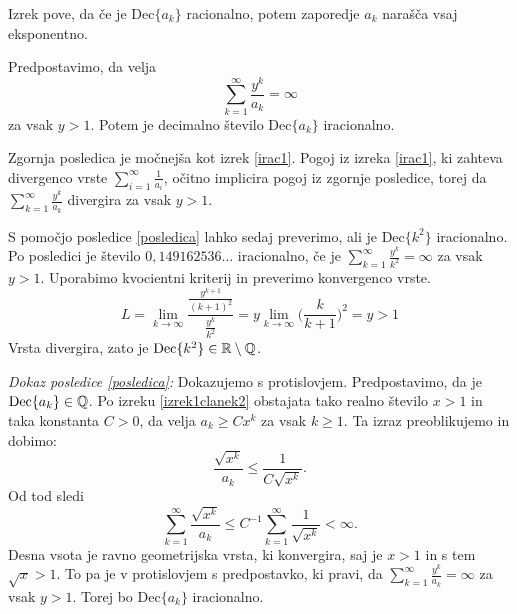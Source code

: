 \documentclass[twoside,11pt]{article}
\begin{document}
Izrek pove, da če je $\text{Dec}\{a_k\}$ racionalno, potem zaporedje $a_k$ narašča vsaj eksponentno.

\begin{posledica}
    \label{posledica}
    Predpostavimo, da velja
    \[
        \sum_{k=1}^{\infty}\frac{y^k}{a_k} = \infty\]
    za vsak $y > 1$. Potem je decimalno število $\text{Dec}\{a_k\}$ iracionalno.
\end{posledica}

Zgornja posledica je močnejša kot izrek \ref{irac1}. 
Pogoj iz izreka \ref{irac1}, ki zahteva divergenco vrste
$\sum_{i=1}^{\infty} \frac{1}{a_i}$, očitno implicira
pogoj iz zgornje posledice, torej da $\sum_{k=1}^{\infty}\frac{y^k}{a_k}$
divergira za vsak $y > 1$.


\begin{zgled}
    S pomočjo posledice \ref{posledica} lahko sedaj preverimo, ali je $\text{Dec}\{k^2\}$ iracionalno.
    Po posledici je število $0{,}149162536\dots$ iracionalno, če je $\sum_{k=1}^{\infty}\frac{y^k}{k^2} = \infty$
    za vsak $y > 1$. Uporabimo kvocientni kriterij in preverimo konvergenco vrste.
    \[
        L = \lim_{k \rightarrow \infty} \frac{\frac{y^{k+1}}{(k+1)^2}}{\frac{y^k}{k^2}}
        = y \lim_{k \rightarrow \infty} \big (\frac{k}{k + 1}\big)^2 = y > 1
    \]
    Vrsta divergira, zato je $\text{Dec}\{k^2\} \in \mathbb{R} \setminus \mathbb{Q}$.
\end{zgled}

\noindent
{\em Dokaz posledice \ref{posledica}:\/}
Dokazujemo s protislovjem. Predpostavimo, da je $\text{Dec}\{a_k\} \in \mathbb{Q}$.
Po izreku \ref{izrek1clanek2} obstajata tako realno število $x > 1$ in taka konstanta $C>0$, da velja
$a_k \geq Cx^k$ za vsak $k \geq 1$. Ta izraz preoblikujemo in dobimo:
\[
    \frac{\sqrt{x^k}}{a_k} \leq \frac{1}{C\sqrt{x^k}}.\] 
Od tod sledi
\[ \sum_{k=1}^{\infty} \frac{\sqrt{x^k}}{a_k} \leq C^{-1} \sum_{k=1}^{\infty} \frac{1}{\sqrt{x^k}} < \infty.\]
Desna vsota je ravno geometrijska vrsta, ki konvergira, saj je $x > 1$ in s tem $\sqrt{x} > 1$.
To pa je v protislovjem s predpostavko, ki pravi, da $\sum_{k=1}^{\infty}\frac{y^k}{a_k} = \infty$ za vsak $y>1$.
Torej bo $\text{Dec}\{a_k\}$ iracionalno.
\QED
\end{document}
